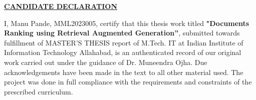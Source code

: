 
\begin{center}
{\underline{\bf\Large CANDIDATE DECLARATION }}\\
\par\vspace{5mm}
\end{center}
\noindent I, Manu Pande, MML2023005, certify that this thesis work titled
\textbf{"Documents Ranking using Retrieval Augmented Generation”}, submitted
towards fulfillment of MASTER'S THESIS report of M.Tech. IT at Indian Institute of
Information Technology Allahabad, is an authenticated record of our original work carried out under the
guidance of Dr. Muneendra Ojha. Due acknowledgements have been made in the text to all other
material used. The project was done in full compliance with the requirements and constraints of the prescribed
curriculum.

\vspace{25mm}

